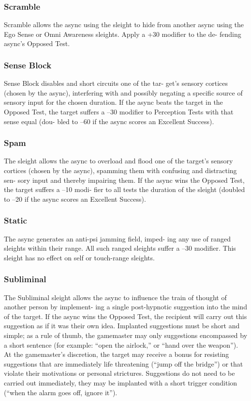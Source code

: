 \subsubsection{Scramble}

Scramble allows the async using the sleight to hide 
from another async using the Ego Sense or Omni 
Awareness sleights. Apply a +30 modifier to the de-
fending async's Opposed Test.

\subsubsection{Sense Block}

Sense Block disables and short circuits one of the tar-
get's sensory cortices (chosen by the async), interfering 
with and possibly negating a specific source of sensory 
input for the chosen duration. If the async beats the 
target in the Opposed Test, the target suffers a –30 
modifier to Perception Tests with that sense equal (dou-
bled to –60 if the async scores an Excellent Success).

\subsubsection{Spam}

The sleight allows the async to overload and flood one 
of the target's sensory cortices (chosen by the async), 
spamming them with confusing and distracting sen-
sory input and thereby impairing them. If the async 
wins the Opposed Test, the target suffers a –10 modi-
fier to all tests the duration of the sleight (doubled to 
–20 if the async scores an Excellent Success).

\subsubsection{Static}

The async generates an anti-psi jamming field, imped-
ing any use of ranged sleights within their range. All 
such ranged sleights suffer a –30 modifier. This sleight 
has no effect on self or touch-range sleights. 

\subsubsection{Subliminal}

The Subliminal sleight allows the async to influence 
the train of thought of another person by implement-
ing a single post-hypnotic suggestion into the mind 
of the target. If the async wins the Opposed Test, the 
recipient will carry out this suggestion as if it was 
their own idea. Implanted suggestions must be short 
and simple; as a rule of thumb, the gamemaster may 
only suggestions encompassed by a short sentence 
(for example: ``open the airlock,'' or ``hand over the 
weapon''). At the gamemaster's discretion, the target 
may receive a bonus for resisting suggestions that are 
immediately life threatening (``jump off the bridge'') 
or that violate their motivations or personal strictures. 
Suggestions do not need to be carried out immediately, 
they may be implanted with a short trigger condition 
(``when the alarm goes off, ignore it'').

